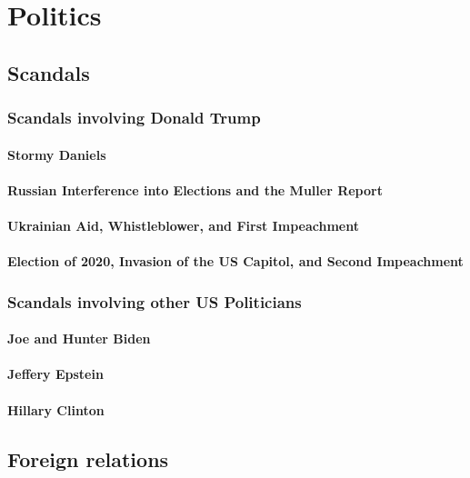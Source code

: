 		
	\section{Politics}
		\subsection{Scandals}
			\subsubsection{Scandals involving Donald Trump}
				\paragraph{Stormy Daniels}
				\paragraph{Russian Interference into Elections and the Muller Report}
				\paragraph{Ukrainian Aid, Whistleblower, and First Impeachment}
				\paragraph{Election of 2020, Invasion of the US Capitol, and Second Impeachment}
				
			\subsubsection{Scandals involving other US Politicians}
				\paragraph{Joe and Hunter Biden}
				\paragraph{Jeffery Epstein}
				\paragraph{Hillary Clinton}

				


		\subsection{Foreign relations}	

